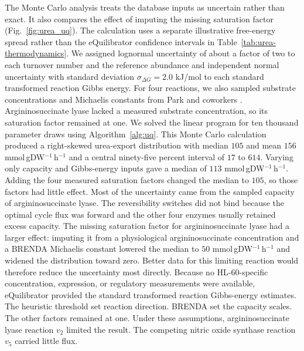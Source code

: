 The Monte Carlo analysis treats the database inputs as uncertain rather than
exact. It also compares the effect of imputing the missing saturation factor
(Fig.~\ref{fig:urea_uq}). The calculation uses a separate illustrative
free-energy spread rather than the eQuilibrator confidence intervals in
Table~\ref{tab:urea-thermodynamics}. We assigned lognormal uncertainty of about
a factor of two to each turnover number and the reference abundance and
independent normal uncertainty with standard deviation
$\sigma_{\Delta G}=2.0$ kJ/mol to each standard transformed reaction Gibbs
energy. For four reactions, we
also sampled substrate concentrations and Michaelis constants from Park and
coworkers \cite{Park2016}. Argininosuccinate lyase lacked a measured substrate
concentration, so its saturation factor remained at one. We solved the linear
program for ten thousand parameter draws using
Algorithm~\ref{alg:uq}. This Monte Carlo calculation produced a right-skewed
urea-export distribution with median $105$ and mean $156$
mmol\,gDW$^{-1}$\,h$^{-1}$ and a central ninety-five percent interval of
$17$ to $614$. Varying only capacity and Gibbs-energy inputs gave a median of
$113$ mmol\,gDW$^{-1}$\,h$^{-1}$. Adding the four measured saturation factors
changed the median to $105$, so those factors had little effect. Most of the
uncertainty came from the sampled capacity of argininosuccinate lyase. The
reversibility switches did not bind because the optimal cycle flux was forward
and the other four enzymes usually retained excess capacity. The
missing saturation factor for argininosuccinate lyase had a larger effect:
imputing it from a physiological argininosuccinate concentration and a BRENDA
Michaelis constant lowered the median to $50$ mmol\,gDW$^{-1}$\,h$^{-1}$ and
widened the distribution toward zero. Better data for this limiting reaction
would therefore reduce the uncertainty most directly. Because no
HL-60-specific concentration, expression, or regulatory measurements were
available, eQuilibrator provided the standard transformed reaction
Gibbs-energy estimates. The heuristic threshold set reaction direction.
BRENDA set the capacity scales. The other factors remained at one. Under
these assumptions, argininosuccinate lyase reaction $v_2$ limited the result.
The competing nitric oxide synthase reaction $v_5$ carried little flux.

